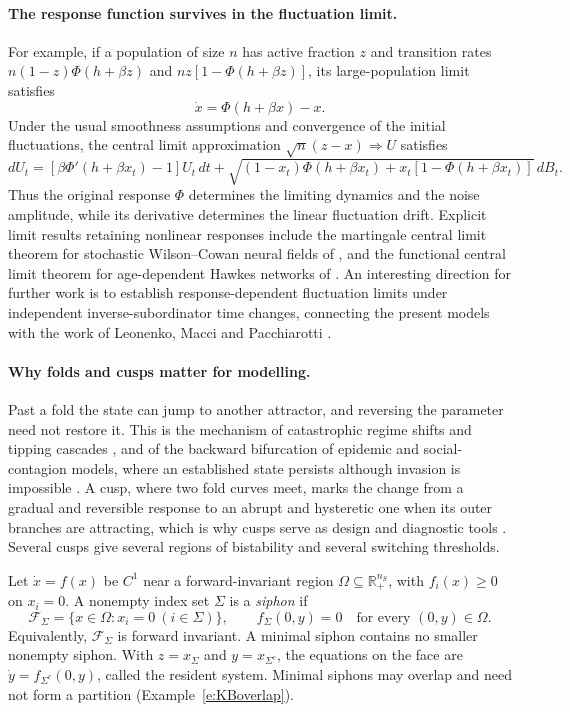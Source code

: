 \ifshort\else
\paragraph{The response function survives in the fluctuation limit.}
For example, if a population of size $n$ has active fraction
$z$ and transition rates
$n(1-z)\Phi(h+\beta z)$ and $nz[1-\Phi(h+\beta z)]$,
its large-population limit satisfies
\[
\dot x=\Phi(h+\beta x)-x.
\]
Under the usual smoothness assumptions and convergence of the
initial fluctuations, the central limit approximation
$\sqrt n(z-x)\Rightarrow U$ satisfies
\[
dU_t=
[\beta \Phi'(h+\beta x_t)-1]U_t\,dt
+\sqrt{(1-x_t)\Phi(h+\beta x_t)
+x_t[1-\Phi(h+\beta x_t)]}\,dB_t.
\]
Thus the original response $\Phi$ determines the limiting dynamics
and the noise amplitude, while its derivative determines the
linear fluctuation drift. Explicit limit results retaining nonlinear
responses include the martingale central limit theorem for
stochastic Wilson--Cowan neural fields of
\cite[Theorem~2.3]{riedler2013}, and the functional central
limit theorem for age-dependent Hawkes networks of
\cite{chevallier2017}. An interesting direction for further work is
to establish response-dependent fluctuation limits under independent
inverse-subordinator time changes, connecting the present models with
the work of Leonenko, Macci and Pacchiarotti
\cite{LeonenkoMacciPacchiarotti2021}.
\fi




\paragraph{Why folds and cusps matter for modelling.}
Past a fold the state can jump to another attractor, and reversing the parameter need not restore it. This is the mechanism
of catastrophic regime shifts \cite{Scheffer2001} and tipping cascades \cite{kroenke2020}, and of the backward bifurcation of
epidemic and social-contagion models, where an established state persists although invasion is impossible
\cite{IPB,Kook2021,ArinoMc}. A cusp, where two fold curves meet, marks the change from a gradual and reversible response to an
abrupt and hysteretic one when its outer branches are attracting, which is why cusps serve as design and diagnostic tools
\cite{Guc}. Several cusps give  several regions of bistability and several switching thresholds.

Let $\dot x=f(x)$ be $C^1$ near a forward-invariant region
$\Omega\subseteq\mathbb R^{n_S}_+$, with $f_i(x)\ge0$ on $x_i=0$.
A nonempty index set $\Sigma$ is a \emph{siphon} if
\[
 \mathcal F_\Sigma=\{x\in\Omega:x_i=0\ (i\in\Sigma)\},
 \qquad f_\Sigma(0,y)=0
 \quad\text{for every }(0,y)\in\Omega.
\]
Equivalently, $\mathcal F_\Sigma$ is forward invariant. A minimal
siphon contains no smaller nonempty siphon. With $z=x_\Sigma$ and
$y=x_{\Sigma^c}$, the equations on the face are
$\dot y=f_{\Sigma^c}(0,y)$, called the resident system.
Minimal siphons may overlap and need not form a partition
(Example~\ref{e:KBoverlap}).
\eeD


